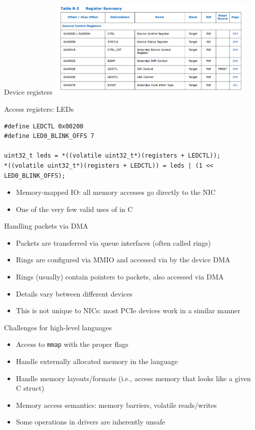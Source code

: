 \documentclass[NET,english,aspectratio=169,notitleframe,draft]{tumbeamer}
\begin{document}
\begin{frame}{Device registers}
\centering\includegraphics[width=0.75\textwidth]{pics/registers}
\end{frame}

\begin{frame}[fragile=singleslide]{Access registers: LEDs}
\begin{verbatim}
#define LEDCTL 0x00200
#define LED0_BLINK_OFFS 7

uint32_t leds = *((volatile uint32_t*)(registers + LEDCTL));
*((volatile uint32_t*)(registers + LEDCTL)) = leds | (1 << LED0_BLINK_OFFS);
\end{verbatim}
\begin{itemize}
\item Memory-mapped IO: all memory accesses go directly to the NIC
\item One of the very few valid uses of  in C
\end{itemize}
\end{frame}


\begin{frame}{Handling packets via DMA}
\begin{itemize}
\item Packets are transferred via queue interfaces (often called rings)
\item Rings are configured via MMIO and accessed via by the device DMA
\item Rings (usually) contain pointers to packets, also accessed via DMA
\pause
\vspace{1em}
\item Details vary between different devices
\item This is not unique to NICs: most PCIe devices work in a similar manner
\end{itemize}
\end{frame}


\begin{frame}{Challenges for high-level languages}
\begin{itemize}
\item Access to \texttt{mmap} with the proper flags
\item Handle externally allocated memory in the language
\item Handle memory layouts/formats (i.e., access memory that looks like a given C struct)
\item Memory access semantics: memory barriers, volatile reads/writes
\item Some operations in drivers are inherently unsafe
\end{itemize}
\end{frame}
\end{document}
